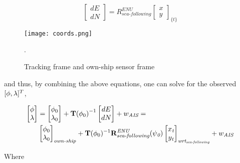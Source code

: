 \begin{equation}
\begin{bmatrix}
dE\\ dN
\end{bmatrix}=
R_{\textit{sea-following}}^{\textit{ENU}}
\begin{bmatrix}
x\\ y
\end{bmatrix}_{\textit{\{t\}}}
\end{equation}


\begin{figure}[H]
	\centering
	\texttt{[image: coords.png]}
	\caption{Tracking frame and own-ship sensor frame}.
	\label{fig:track_vs_own_ship}
\end{figure}



and thus, by combining the above equations, one can solve for the observed $[{\phi}, {\lambda}]^{T}$,

\begin{equation}
\begin{aligned}
\begin{bmatrix}
{\phi}\\ {\lambda}
\end{bmatrix}&=
\begin{bmatrix}
{\phi}_{0}\\ {\lambda}_{0}
\end{bmatrix} + {\mathbf{T}({\phi}_{0})}^{-1}\begin{bmatrix}
dE\\ dN
\end{bmatrix} + {w}_{\textit{AIS}}=  \\
&\begin{bmatrix}
{\phi}_{0}\\ {\lambda}_{0}
\end{bmatrix}_{\textit{own-ship}} + \mathbf{T}({\phi}_{0})^{-1}
\mathbf{R}^{\textit{ENU}}_{\textit{sea-following}}({\psi}_{\textit{0}})
\begin{bmatrix}
x_{\textit{t}}\\ y_{\textit{t}}
\end{bmatrix}_{\textit{wrt}_{{\textit{sea-following}}}}+{w}_{\textit{AIS}}
\end{aligned}
\end{equation}


Where

